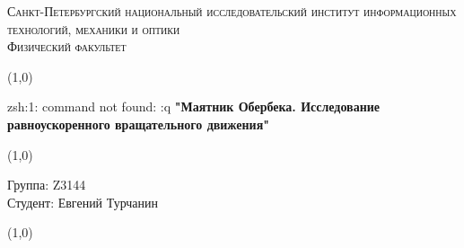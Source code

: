 \documentclass[a4paper]{article}
\begin{document}
\begin{center}
\textsc{Санкт-Петербургский национальный исследовательский институт информационных технологий, механики и оптики\\[3mm]
Физический факультет} \\[3mm]

\end{center}
\vspace{5mm}
\line(1,0){\textwidth}
\begin{center}
zsh:1: command not found: :q
\textbf{"Маятник Обербека. Исследование равноускоренного вращательного движения"}
\end{center}
\vspace{2mm}
\line(1,0){\textwidth}
\vspace{5mm}
\begin{minipage}{0.4\textwidth}
    Группа: Z3144 \\
    Студент: Евгений Турчанин\\
    \vspace{1mm}
\end{minipage}
\hfill
\vspace{1mm}
\line(1,0){\textwidth}
\end{document}
